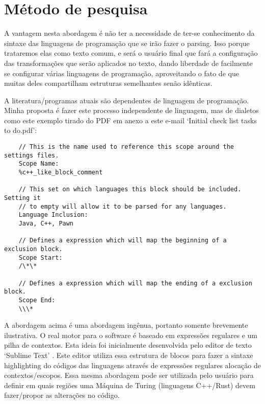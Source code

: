 


\section{Método de pesquisa}

    A vantagem nesta abordagem é não ter a necessidade de ter-se conhecimento da sintaxe das linguagens
    de programação que se irão fazer o parsing. Isso porque trataremos elas como texto comum, e será
    o usuário final que fará a configuração das transformações que serão aplicados no texto, dando
    liberdade de facilmente se configurar várias linguagens de programação, aproveitando o fato de que
    muitas deles compartilham estruturas semelhantes senão idênticas.

    A literatura/programas atuais são dependentes de linguagem de programação. Minha proposta é fazer este
    processo independente de linguagem, mas de dialetos como este exemplo tirado do PDF em anexo a este e-mail
    `Initial check list tasks to do.pdf':

    \begin{lstlisting}
    // This is the name used to reference this scope around the settings files.
    Scope Name:
    %c++_like_block_comment

    // This set on which languages this block should be included. Setting it
    // to empty will allow it to be parsed for any languages.
    Language Inclusion:
    Java, C++, Pawn

    // Defines a expression which will map the beginning of a exclusion block.
    Scope Start:
    /\*\*

    // Defines a expression which will map the ending of a exclusion block.
    Scope End:
    \\\*
    \end{lstlisting}
    \vspace*{-4mm}

    A abordagem acima é uma abordagem ingênua, portanto somente brevemente ilustrativa. O real motor
    para o software é baseado em expressões regulares e um pilha de contextos. Esta ideia foi
    inicialmente desenvolvida pelo editor de texto `Sublime Text' \cite{Skinner}. Este editor
    utiliza essa estrutura de blocos para fazer a sintaxe highlighting do códigos das linguagens
    através de expressões regulares alocação de contextos/escopos. Essa mesma abordagem pode ser
    utilizada pelo usuário para definir em quais regiões uma Máquina de Turing (linguagens C++/Rust)
    devem fazer/propor as alterações no código.

